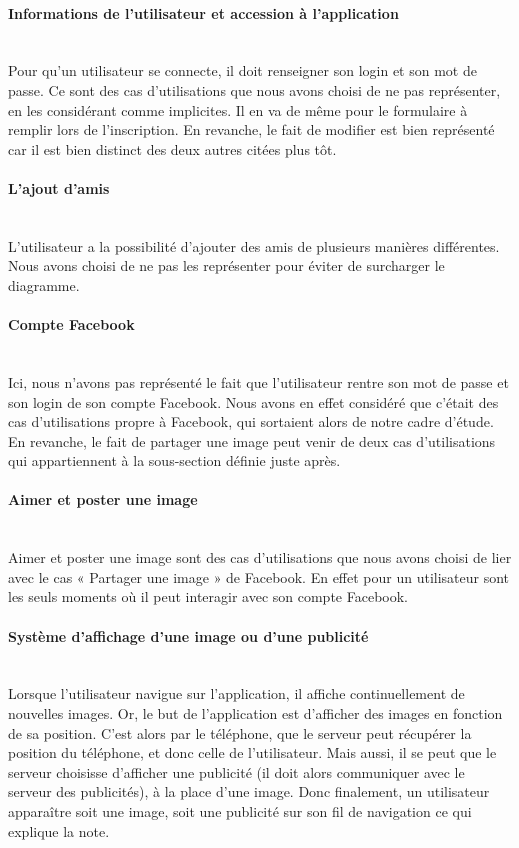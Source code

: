 \documentclass[11pt,a4paper]{article}
\begin{document}
\paragraph{\textcolor{myGreen}{Informations de l’utilisateur et accession à l’application}}~\\
Pour qu’un utilisateur se connecte, il doit renseigner son
login et son mot de passe. Ce sont des cas d’utilisations
que nous avons choisi de ne pas représenter, en les
considérant comme implicites. Il en va de même pour le
formulaire à remplir lors de l’inscription. En revanche,
le fait de modifier est bien représenté car il est bien
distinct des deux autres citées plus tôt.

\paragraph{\textcolor{myKaki}{L'ajout d'amis}}~\\
L’utilisateur a la possibilité d’ajouter des amis de
plusieurs manières différentes. Nous avons choisi de ne
pas les représenter pour éviter de surcharger le
diagramme.

\paragraph{\textcolor{myBlue}{Compte Facebook}}~\\
Ici, nous n’avons pas représenté le fait que l’utilisateur
rentre son mot de passe et son login de son compte
Facebook. Nous avons en effet considéré que c’était des
cas d’utilisations propre à Facebook, qui sortaient alors
de notre cadre d’étude. En revanche, le fait de partager
une image peut venir de deux cas d’utilisations qui
appartiennent à la sous-section définie juste après.

\paragraph{\textcolor{myPurple}{Aimer et poster une image}}~\\
Aimer et poster une image sont des cas d’utilisations que
nous avons choisi de lier avec le cas « Partager une image
» de Facebook. En effet pour un utilisateur sont les seuls
moments où il peut interagir avec son compte Facebook.

\paragraph{\textcolor{myOrange}{Système d'affichage d'une image ou d'une publicité}}~\\
Lorsque l’utilisateur navigue sur l’application, il
affiche continuellement de nouvelles images. Or, le but de
l’application est d’afficher des images en fonction de sa
position. C’est alors par le téléphone, que le serveur
peut récupérer la position du téléphone, et donc celle de
l’utilisateur. Mais aussi, il se peut que le serveur
choisisse d’afficher une publicité (il doit alors
communiquer avec le serveur des publicités), à la place
d’une image. Donc finalement, un utilisateur apparaître
soit une image, soit une publicité sur son fil de
navigation ce qui explique la note. 
\end{document}
